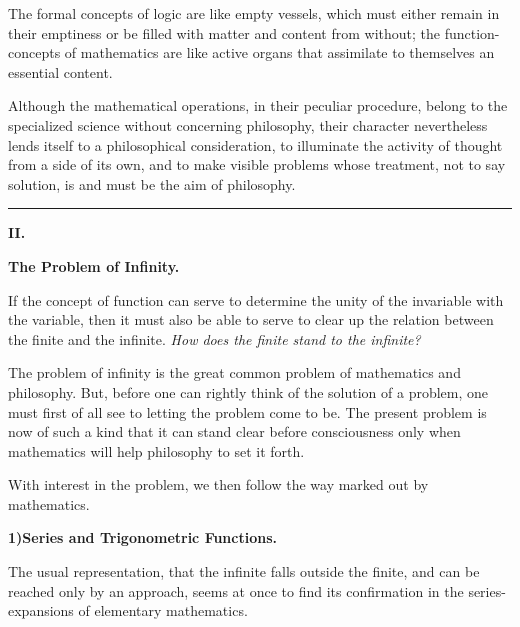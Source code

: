 \documentclass[12pt]{book}
\begin{document}
The formal concepts of logic are like empty vessels, which must either remain in
their emptiness or be filled with matter and content from without; the
function-concepts of mathematics are like active organs that assimilate to
themselves an essential content.

Although the mathematical operations, in their peculiar procedure, belong to the
specialized science without concerning philosophy, their character nevertheless
lends itself to a philosophical consideration, to illuminate the activity of
thought from a side of its own, and to make visible problems whose treatment, not
to say solution, is and must be the aim of philosophy.

\begin{center}\rule{2.5cm}{0.4pt}\end{center}

\begin{center}
  {\large\bfseries II.}\par\vspace{4pt}
  {\Large\bfseries The Problem of Infinity.}
\end{center}
{}

If the concept of function can serve to determine the unity of the invariable with
the variable, then it must also be able to serve to clear up the relation between
the finite and the infinite. \emph{How does the finite stand to the infinite?}

The problem of infinity is the great common problem of mathematics and philosophy.
But, before one can rightly think of the solution of a problem, one must first of
all see to letting the problem come to be. The present problem is now of
such a kind that it can stand clear before consciousness only when mathematics
will help philosophy to set it forth.

With interest in the problem, we then follow the way marked out by mathematics.

\begin{center}
  {\bfseries 1)\quad Series and Trigonometric Functions.}
\end{center}
{}

The usual representation, that the infinite falls outside the finite, and can be
reached only by an approach, seems at once to find its confirmation in the
series-expansions of elementary mathematics.
\end{document}
